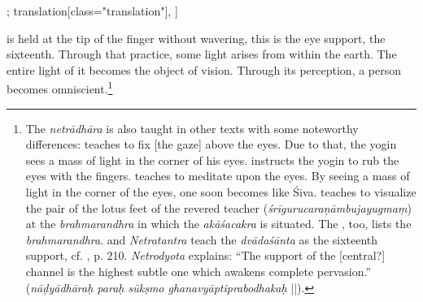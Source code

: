 \begin{alignment}[
  texts=edition[class="edition"];
  translation[class="translation"],
  ]
\begin{translation}
\begin{tlate} is held at the tip of the finger without wavering, this is the eye support, the sixteenth. Through that practice, some light arises from within the earth. The entire light of it becomes the object of vision. Through its perception, a person becomes omniscient.\footnote{The \textit{netrādhāra} is also taught in other texts with some noteworthy differences:  teaches to fix [the gaze] above the eyes. Due to that, the yogin sees a mass of light in the corner of his eyes.  instructs the yogin to rub the eyes with the fingers.  teaches to meditate upon the eyes. By seeing a mass of light in the corner of the eyes, one soon becomes like Śiva.  teaches to visualize the pair of the lotus feet of the revered teacher (\textit{śrīgurucaraṇāmbujayugmaṃ}) at the \textit{brahmarandhra} in which the \textit{akāśacakra} is situated. The , too, lists the \textit{brahmarandhra}.  and \textit{Netratantra} teach the \textit{dvādaśānta} as the sixteenth support, cf. , p. 210. \textit{Netrodyota} explains: ``The support of the [central?] channel is the highest subtle one which awakens complete pervasion.'' (\textit{nāḍyādhāraḥ paraḥ sūkṣmo ghanavyāptiprabodhakaḥ} ||).}
      \flushpage 
    \end{tlate}
  \end{translation}
\end{alignment}
\pagebreak %
